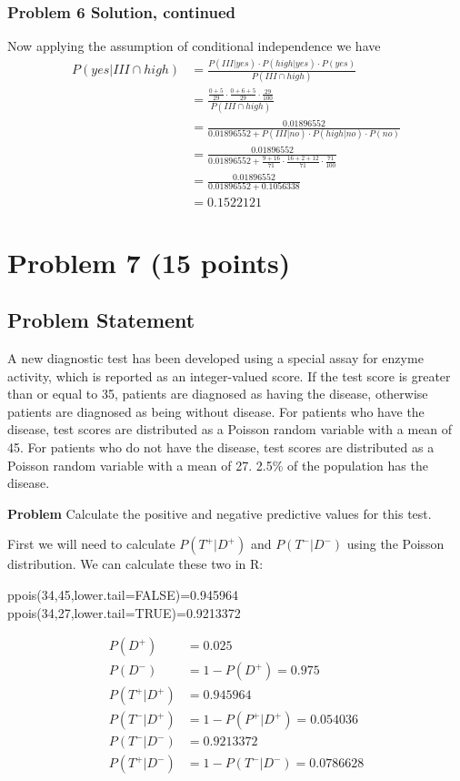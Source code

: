 \documentclass[12pt]{article}
\theoremstyle{definition}
\begin{document}
\subsubsection*{Problem 6 Solution, continued}
Now applying the assumption of conditional independence we have
\begin{align*}
P(yes|III \cap high) &= \frac{P(III|yes) \cdot P(high|yes) \cdot P(yes)}{P(III \cap high)}\\
&= \frac{\frac{0 + 5}{29} \cdot \frac{0 + 6 + 5}{29} \cdot \frac{29}{100}}{P(III \cap high)}\\
&= \frac{0.01896552}{0.01896552 + P(III|no) \cdot P(high|no) \cdot P(no)}\\
&= \frac{0.01896552}{0.01896552 + \frac{9 + 16}{71} \cdot \frac{16 + 2 + 12}{71} \cdot \frac{71}{100}}\\
&= \frac{0.01896552}{0.01896552+ 0.1056338}\\
&= 0.1522121
\end{align*}







\newpage
\section*{Problem 7 (15 points)}

\subsection*{Problem Statement}

A new diagnostic test has been developed using a special assay for enzyme activity, which is reported as an integer-valued score. If the test score is greater than or equal to 35, patients are diagnosed as having the disease, otherwise patients are diagnosed as being without disease. For patients who have the disease, test scores are distributed as a Poisson random variable with a mean of 45. For patients who do not have the disease, test scores are distributed as a Poisson random variable with a mean of 27. 2.5\% of the population has the disease.

\bigskip
\noindent
{\bf Problem} Calculate the positive and negative predictive values for this test.

First we will need to calculate $P(T^+|D^+)$ and $P(T^-|D^-)$ using the Poisson distribution. We can calculate these two in R:
\begin{verbatim*}
ppois(34,45,lower.tail=FALSE)=0.945964
ppois(34,27,lower.tail=TRUE)=0.9213372
\end{verbatim*}
\begin{align*}
P(D^+) &= 0.025\\
P(D^-) &= 1 - P(D^+) = 0.975\\
P(T^+|D^+) &= 0.945964\\
P(T^-|D^+) &= 1 - P(P^+|D^+) = 0.054036\\
P(T^-|D^-) &= 0.9213372\\
P(T^+|D^-) &= 1 - P(T^-|D^-) = 0.0786628
\end{align*}
\end{document}
